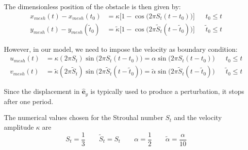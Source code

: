 \documentclass[11 pt]{article}
\begin{document}
The dimensionless position of the obstacle is then given by:
\begin{equation}
\begin{aligned}
    x_{mesh}(t) - x_{mesh}(t_0) &= \kappa \Big[1 - \cos{\Big(2\pi S_t (t - t_0)\Big)} \Big] && t_0 \leq t\\
    y_{mesh}(t) - y_{mesh}(\tilde t_0) &= \tilde \kappa \Big[1 - \cos{\Big(2\pi \tilde S_t (t - \tilde t_0)\Big)} \Big] && \tilde t_0 \leq t
\end{aligned}
\end{equation}

However, in our model, we need to impose the velocity as boundary condition:
\begin{equation}
\begin{aligned}
    u_{mesh}(t) &= \kappa (2\pi S_t) \sin{\big(2\pi S_t (t - t_0)\big)} = \alpha \sin{\big(2\pi S_t (t - t_0)\big)} && t_0 \leq t\\
    v_{mesh}(t) &= \tilde \kappa (2\pi \tilde S_t ) \sin{\big(2\pi \tilde S_t (t - \tilde t_0)\big)} = \tilde \alpha \sin{\big(2\pi \tilde S_t (t - \tilde t_0)\big)} && \tilde t_0 \leq t
\end{aligned}
\end{equation}

Since the displacement in $\mathbf{\hat e}_y$ is typically used to produce a perturbation, it stops after one period. 

The numerical values chosen for the Strouhal number $S_t$ and the velocity amplitude $\kappa$ are
\begin{equation}
    S_t = \frac{1}{3} \qquad \tilde S_t = S_t \qquad \alpha = \frac{1}{2} \qquad \tilde \alpha = \frac{\alpha}{10}
\end{equation}
\end{document}
